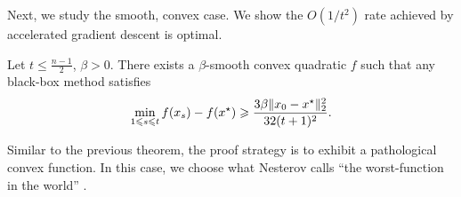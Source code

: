 Next, we study the smooth, convex case. We show the $O(1/t^2)$ rate achieved by
accelerated gradient descent is optimal.

\begin{theorem}[Smooth-$f$]\label{theorem:lb-smooth}
Let $t \leq \frac{n-1}{2}$, $\beta > 0$. There exists a $\beta$-smooth convex
quadratic $f$ such that any black-box method satisfies
\begin{align}
    \min_{1 \leqslant s \leqslant t} f(x_s) - f(x^\star)
    \geqslant \frac{3\beta \lVert x_0 - x^\star\rVert_2^2}{32(t+1)^2}.
\end{align}
\end{theorem}
Similar to the previous theorem, the proof strategy is to exhibit 
a pathological convex function. In this case, we choose what Nesterov calls
``the worst-function in the world'' \cite{ilco2004}.


